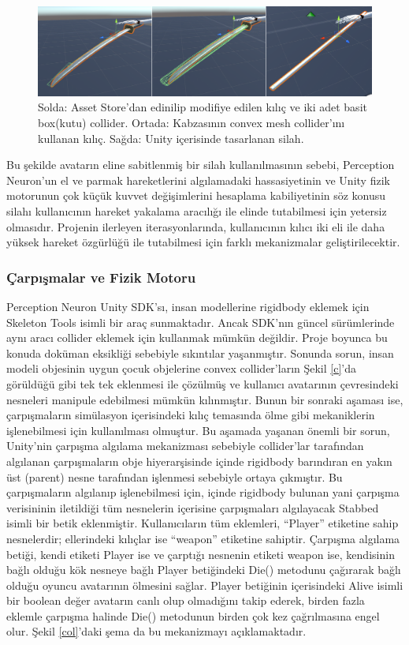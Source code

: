 \documentclass[a4paper, 12pt, titlepage]{article}
\begin{document}
\begin{figure}[ht!]
    \centering
        \includegraphics[width=6in]{images/s2}
    \caption{Solda: Asset Store'dan edinilip modifiye edilen kılıç ve iki adet basit box(kutu)
             collider. Ortada: Kabzasının convex mesh collider'ını kullanan kılıç. Sağda: Unity
             içerisinde tasarlanan silah.}
    \label{s}
\end{figure}

Bu şekilde avatarın eline sabitlenmiş bir silah kullanılmasının sebebi, Perception Neuron’un el ve
parmak hareketlerini algılamadaki hassasiyetinin ve Unity fizik motorunun çok küçük kuvvet
değişimlerini hesaplama kabiliyetinin söz konusu silahı kullanıcının hareket yakalama aracılığı ile
elinde tutabilmesi için yetersiz olmasıdır. Projenin ilerleyen iterasyonlarında, kullanıcının
kılıcı iki eli ile daha yüksek hareket özgürlüğü ile tutabilmesi için farklı mekanizmalar
geliştirilecektir.

\subsubsection{Çarpışmalar ve Fizik Motoru}
Perception Neuron Unity SDK’sı, insan modellerine rigidbody eklemek için Skeleton Tools isimli bir
araç sunmaktadır. Ancak SDK’nın güncel sürümlerinde aynı aracı collider eklemek için kullanmak
mümkün değildir. Proje boyunca bu konuda doküman eksikliği sebebiyle sıkıntılar yaşanmıştır.
Sonunda sorun, insan modeli objesinin uygun çocuk objelerine convex collider’ların Şekil \ref{c}’da
görüldüğü gibi tek tek eklenmesi ile çözülmüş ve kullanıcı avatarının çevresindeki nesneleri
manipule edebilmesi mümkün kılınmıştır. Bunun bir sonraki aşaması ise, çarpışmaların simülasyon
içerisindeki kılıç temasında ölme gibi mekaniklerin işlenebilmesi için kullanılması olmuştur. Bu
aşamada yaşanan önemli bir sorun, Unity’nin çarpışma algılama mekanizması sebebiyle collider’lar
tarafından algılanan çarpışmaların obje hiyerarşisinde içinde rigidbody barındıran en yakın
üst (parent) nesne tarafından işlenmesi sebebiyle ortaya çıkmıştır. Bu çarpışmaların algılanıp
işlenebilmesi için, içinde rigidbody bulunan yani çarpışma verisininin iletildiği tüm nesnelerin
içerisine çarpışmaları algılayacak Stabbed isimli bir betik eklenmiştir. Kullanıcıların tüm
eklemleri, “Player” etiketine sahip nesnelerdir; ellerindeki kılıçlar ise “weapon” etiketine
sahiptir. Çarpışma algılama betiği, kendi etiketi Player ise ve çarptığı nesnenin etiketi weapon
ise, kendisinin bağlı olduğu kök nesneye bağlı Player betiğindeki Die() metodunu çağırarak bağlı
olduğu oyuncu avatarının ölmesini sağlar. Player betiğinin içerisindeki Alive isimli bir boolean
değer avatarın canlı olup olmadığını takip ederek, birden fazla eklemle çarpışma halinde Die()
metodunun birden çok kez çağrılmasına engel olur. Şekil \ref{col}’daki şema da bu mekanizmayı
açıklamaktadır.
\end{document}

